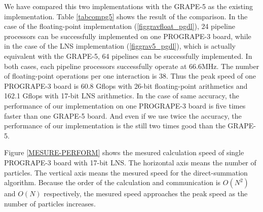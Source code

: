\documentclass{llncs}
\begin{document}
We have compared this two implementations with the GRAPE-5 as the
existing implementation.  Table \ref{tabcompg5} shows the result of
the comparison.  In the case of the floating-point implementation
(\ref{figgravfloat_pgdl}), 24 pipeline processors can be successfully
implemented on one PROGRAPE-3 board, while in the case of the
LNS implementation (\ref{figgrav5_pgdl}), which is actually
equivalent with the GRAPE-5, 64 pipelines can be successfully
implemented.  In both cases, each pipeline processors successfully
operate at 66.6MHz.  The number of floating-point operations per one
interaction is 38.  Thus the peak speed of one PROGRAPE-3 board is
60.8 Gflops with 26-bit floating-point arithmetics and 162.1 Gflops
with 17-bit LNS arithmetics.
In the case of same accuracy, the performance of our implementation on one PROGRAPE-3
board is five times faster than one GRAPE-5 board.  And even if we use
twice the accuracy, the performance of our implementation is the still
two times good than the GRAPE-5.

Figure \ref{MESURE-PERFORM} shows the mesured calculation speed of
single PROGRAPE-3 board with 17-bit LNS.  The
horizontal axis means the number of particles.  The vertical axis
means the mesured speed for the direct-summation algorithm.  Because
the order of the calculation and communication is $O(N^2)$ and $O(N)$
respectively, the mesured speed approaches the peak speed as the
number of particles increases.
\end{document}
